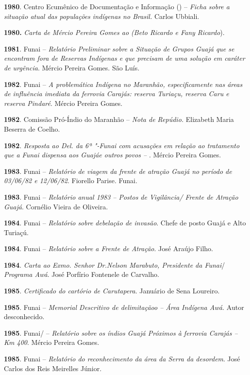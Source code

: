 \textbf{1980}. Centro Ecumênico de Documentação e Informação () --
\emph{Ficha sobre a situação atual das populações indígenas no Brasil.}
Carlos Ubbiali.

\textbf{1980.} \emph{Carta de Mércio Pereira Gomes ao  (Beto Ricardo
e Fany Ricardo}).

\textbf{1981}. Funai -- \emph{Relatório Preliminar sobre a Situação de
Grupos Guajá que se encontram fora de Reservas Indígenas e que precisam
de uma solução em caráter de urgência}. Mércio Pereira Gomes. São Luís.

\textbf{1982}. Funai -- \emph{A problemática Indígena no Maranhão,
especificamente nas áreas de influência imediata da ferrovia Carajás:
reserva Turiaçu, reserva Caru e reserva Pindaré}. Mércio Pereira Gomes.

\textbf{1982}. Comissão Pró-Índio do Maranhão -- \emph{Nota de Repúdio.}
Elizabeth Maria Beserra de Coelho.

\textbf{1982}. \emph{Resposta ao Del. da 6ª "-Funai com acusações em
relação ao tratamento que a Funai dispensa aos Guajáe outros povos --
}. Mércio Pereira Gomes.

\textbf{1983}. Funai -- \emph{Relatório de viagem da frente de atração
Guajá no período de 03/06/82 e 12/06/82}. Fiorello Parise. Funai.

\textbf{1983}. Funai -- \emph{Relatório anual 1983 -- Postos de
Vigilância/ Frente de Atração Guajá}. Cornélio Vieira de Oliveira.

\textbf{1984}. Funai -- \emph{Relatório sobre debelação de invasão}.
Chefe de posto Guajá e Alto Turiaçú.

\textbf{1984}. Funai -- \emph{Relatório sobre a Frente de Atração}. José
Araújo Filho.

\textbf{1984}. \emph{Carta ao Exmo. Senhor Dr.Nelson Marabuto,
Presidente da Funai}/ \emph{Programa Awá}. José Porfírio Fontenele de
Carvalho.

\textbf{1985}. \emph{Certificado do cartório de Carutapera}. Januário de
Sena Loureiro.

\textbf{1985}. Funai -- \emph{Memorial Descritivo de delimitaçãoo --
Área Indígena Awá.} Autor desconhecido.

\textbf{1985}. Funai/ -- \emph{Relatório sobre os índios Guajá
Próximos à ferrovia Carajás -- Km 400}. Mércio Pereira Gomes.

\textbf{1985}. Funai -- \emph{Relatório do reconhecimento da área da
Serra da desordem}. José Carlos dos Reis Meirelles Júnior.

